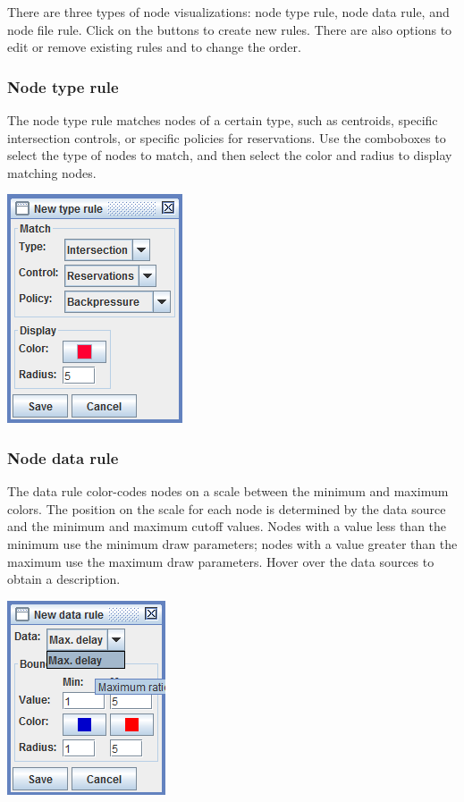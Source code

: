 There are three types of node visualizations: node type rule, node data rule, and node file rule. Click on the buttons to create new rules. There are also options to edit or remove existing rules and to change the order.

\subsubsection{Node type rule}

The node type rule matches nodes of a certain type, such as centroids, specific intersection controls, or specific policies for reservations. Use the comboboxes to select the type of nodes to match, and then select the color and radius to display matching nodes.
\begin{center}
\includegraphics[scale=1]{images/editor6.png}
\end{center}

\subsubsection{Node data rule}

The data rule color-codes nodes on a scale between the minimum and maximum colors. The position on the scale for each node is determined by the data source and the minimum and maximum cutoff values. Nodes with a value less than the minimum use the minimum draw parameters; nodes with a value greater than the maximum use the maximum draw parameters. Hover over the data sources to obtain a description.

\begin{center}
\includegraphics[scale=1]{images/editor6b.png}
\end{center}

